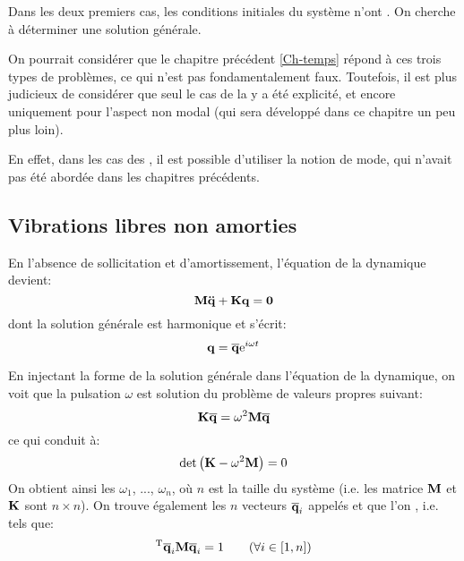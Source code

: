 Dans les deux premiers cas, les conditions initiales du système n'ont . 
On cherche à déterminer une solution générale. 


\medskip
On pourrait considérer que le chapitre précédent \ref{Ch-temps} répond à ces trois
types de problèmes, ce qui n'est pas fondamentalement faux.
Toutefois, il est plus judicieux de considérer que seul le cas de la   
y a été explicité, et encore uniquement pour l'aspect non modal (qui sera développé dans ce chapitre 
un peu plus loin).

En effet, dans les cas des  , 
il est possible d'utiliser la notion de mode, qui n'avait pas été abordée dans les chapitres précédents.





\medskip
\subsection{Vibrations libres non amorties}

En l'absence de sollicitation et d'amortissement, l'équation de la dynamique devient:
\begin{equation} \MM{M}\VV{\ddot{q}}+\MM{K}\VV{q}=\VV{0} \end{equation}
dont la solution générale est harmonique et s'écrit:
\begin{equation} \VV{q}=\VV{\overline{q}}\mathrm{e}^{i\omega t} \end{equation}

En injectant la forme de la solution générale dans l'équation de la dynamique, on voit que la
pulsation $\omega$ est solution du problème de valeurs propres suivant:
\begin{equation} \MM{K}\VV{\overline{q}}=\omega^2\MM{M}\VV{\overline{q}} \end{equation}
ce qui conduit à:
\begin{equation} \det\left(\MM{K}-\omega^2\MM{M}\right)=0\end{equation}
\medskipvm
On obtient ainsi les  
$\omega_1$, ..., $\omega_n$, où $n$ est la taille du système (i.e. les matrice $\MM{M}$ et $\MM{K}$ sont $n\times n$).
\medskipvm
On trouve également les $n$ vecteurs $\VV{\overline{q}}_i$ appelés  et que l'on , i.e. tels que:
\begin{equation} \LL{\overline{q}}_i\MM{M}\VV{\overline{q}}_i=1 \qquad  (\forall i\in[1,n]) \end{equation}

